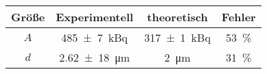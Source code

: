 \label{tab:tabFehler}
	\begin{tabular}{cccc}
		\toprule
		{Größe}&{Experimentell}&{theoretisch}&{Fehler}\\
		\midrule
		$A$ & \SI{485(7)}{\kilo\becquerel} & \SI{317(1)}{\kilo\becquerel}  & \SI{53}{\%} \\
		$d$ & \SI{2,62(18)}{\micro\meter} & \SI{2}{\micro\meter} & \SI{31}{\%}\\
		\bottomrule
	\end{tabular}
